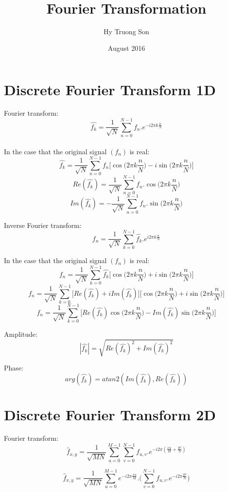 \documentclass{article}
\title{Fourier Transformation}
\author{Hy Truong Son}
\date{August 2016}
\begin{document}
\maketitle

\section{Discrete Fourier Transform 1D}
Fourier transform:
$$ \hat{f_k} = \frac{1}{\sqrt{N}} \sum\limits_{n = 0}^{N - 1} f_n.e^{-i2\pi k\frac{n}{N}} $$ \\

In the case that the original signal $(f_n)$ is real:
$$ \hat{f_k} = \frac{1}{\sqrt{N}} \sum\limits_{n = 0}^{N - 1} f_n \bigg[\cos \big(2\pi k\frac{n}{N} \big) - i\sin \big(2\pi k\frac{n}{N} \big) \bigg] $$
$$ Re(\hat{f_k}) = \frac{1}{\sqrt{N}} \sum\limits_{n = 0}^{N - 1} f_n.\cos \big ( 2\pi k \frac{n}{N} \big ) $$
$$ Im(\hat{f_k}) = - \frac{1}{\sqrt{N}} \sum\limits_{n = 0}^{N - 1} f_n.\sin \big ( 2\pi k \frac{n}{N} \big ) $$

Inverse Fourier transform:
$$ f_n = \frac{1}{\sqrt{N}} \sum\limits_{k = 0}^{N - 1} \hat{f_k}.e^{i2\pi k\frac{n}{N}} $$

In the case that the original signal $(f_n)$ is real:
$$ f_n = \frac{1}{\sqrt{N}} \sum\limits_{k = 0}^{N - 1} \hat{f_k} \bigg[ \cos \big( 2\pi k\frac{n}{N} \big) + i\sin \big( 2\pi k\frac{n}{N} \big) \bigg] $$
$$ f_n = \frac{1}{\sqrt{N}} \sum\limits_{k = 0}^{N - 1} \bigg[ Re(\hat{f_k}) + i Im(\hat{f_k}) \bigg] \bigg[ \cos \big(2\pi k\frac{n}{N} \big) + i\sin \big( 2\pi k\frac{n}{N} \big) \bigg] $$
$$ f_n = \frac{1}{\sqrt{N}} \sum\limits_{k = 0}^{N - 1} \bigg[ Re(\hat{f_k}) \cos \big( 2\pi k\frac{n}{N} \big) - Im(\hat{f_k}) \sin \big( 2\pi k\frac{n}{N} \big) \bigg]$$

Amplitude: 
$$ |\hat{f_k}| = \sqrt{Re(\hat{f_k})^2 + Im(\hat{f_k})^2} $$

Phase: 
$$ arg(\hat{f_k}) = atan2(Im(\hat{f_k}), Re(\hat{f_k})) $$

\section{Discrete Fourier Transform 2D}
Fourier transform:
$$ \hat{f}_{x, y} = \frac{1}{\sqrt{MN}} \sum\limits_{u = 0}^{M - 1} \sum\limits_{v = 0}^{N - 1} f_{u, v}.e^{-i2\pi (\frac{xu}{M} + \frac{yv}{N})} $$

$$ \hat{f}_{x, y} = \frac{1}{\sqrt{MN}} \sum\limits_{u = 0}^{M - 1} e^{-i2\pi \frac{xu}{M}} . \bigg( \sum\limits_{v = 0}^{N - 1} f_{u, v} . e^{-i2\pi \frac{yv}{N}}\bigg) $$
\end{document}
